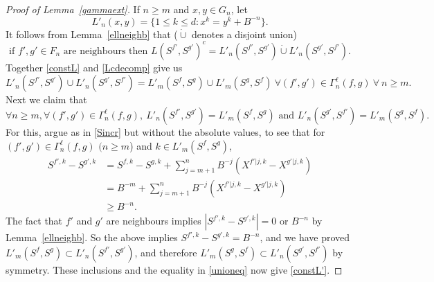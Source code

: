 \documentclass[10pt,a4paper]{amsart}
\begin{document}
\begin{proof}[Proof of Lemma~\ref{gammaext}]
If $n\ge m$ and $x,y\in G_n$, let 
\[L'_n(x,y)=\{1\le k \le d:x^k=y^k+B^{-n}\}.\]
It follows from Lemma~\ref{ellneighb} that ($\dot\cup$ denotes a disjoint union)
\begin{equation}\label{Lcdecomp}
\text{if $f',g'\in F_n$ are neighbours then $L(S^{f'},S^{g'})^c=L'_n(S^{f'},S^{g'})\dot\cup L'_n(S^{g'},S^{f'})$.}
\end{equation}
Together \eqref{constL} and \eqref{Lcdecomp} give us
\begin{equation}\label{unioneq}
L'_n(S^{f'},S^{g'})\cup L'_n(S^{g'},S^{f'})=L'_m(S^f,S^g)\cup L'_m(S^g,S^f)\ \forall (f',g')\in \Gamma_n^\ell(f,g)\ \forall \ n\ge m.
\end{equation}
Next we claim that 
\begin{equation}\label{constL'}
\forall n\ge m, \forall(f',g')\in \Gamma_n^\ell(f,g), \ L'_n(S^{f'},S^{g'})=L'_m(S^f,S^g)\text{ and }L'_n(S^{g'},S^{f'})=L'_m(S^g,S^f).
\end{equation}
For this, argue as in \eqref{Sincr} but without the absolute values, to see that for $(f',g')\in\Gamma^\ell_n(f,g)$ $(n\ge m$) and $k\in L'_m(S^f,S^g)$, 
\begin{align*}
 S^{f',k}-S^{g',k}&=S^{f,k}-S^{g,k}+\sum_{j=m+1}^n B^{-j}(X^{f'|j,k}-X^{g'|j,k})\\
&=B^{-m}+\sum_{j=m+1}^nB^{-j}(X^{f'|j,k}-X^{g'|j,k})\\
&\ge B^{-n}.
\end{align*}
The fact that $f'$ and $g'$ are neighbours implies $|S^{f',k}-S^{g',k}|=0$ or $B^{-n}$ by Lemma~\ref{ellneighb}. So the above implies $S^{f',k}-S^{g',k}=B^{-n}$, and we have proved $L'_m(S^f,S^g)\subset L'_n(S^{f'},S^{g'})$, and therefore $L'_m(S^g,S^f)\subset L'_n(S^{g'},S^{f'})$ by symmetry.  
These inclusions and the equality in \eqref{unioneq} now give \eqref{constL'}.


\end{proof}
\end{document}
